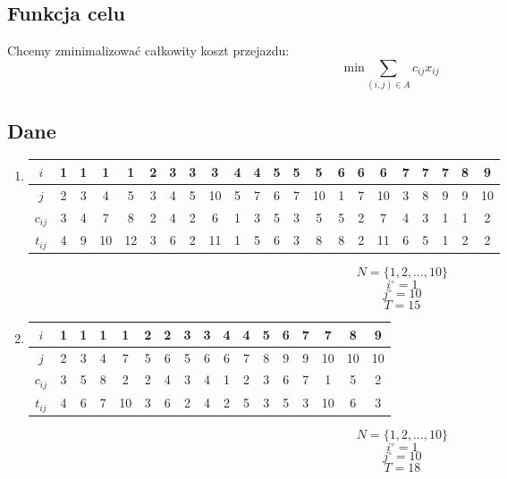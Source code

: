 \documentclass{article}
\begin{document}
\subsection{Funkcja celu}
Chcemy zminimalizować całkowity koszt przejazdu:
\[\text{min} \sum_{(i, j) \in A} c_{ij}x_{ij}\]
\subsection{Dane}
\begin{enumerate}[label=(\alph*)]
    \item 
    \begin{tabular}{|c||c|c|c|c|c|c|c|c|c|c|c|c|c|c|c|c|c|c|c|c|c|}
        \hline
         $i$ & 1 & 1 & 1 & 1 & 2 & 3 & 3 & 3 & 4 & 4 & 5 & 5 & 5 & 6 & 6 & 6 & 7 & 7 & 7 & 8 & 9 \\
        \hline
         $j$ & 2 & 3 & 4 & 5 & 3 & 4 & 5 & 10 & 5 & 7 & 6 & 7 & 10 & 1 & 7 & 10 & 3 & 8 & 9 & 9 & 10 \\
        \hline
         $c_{ij}$ & 3 & 4 & 7 & 8 & 2 & 4 & 2 & 6 & 1 & 3 & 5 & 3 & 5 & 5 & 2 & 7 & 4 & 3 & 1 & 1 & 2 \\
        \hline
         $t_{ij}$ & 4 & 9 & 10 & 12 & 3 & 6 & 2 & 11 & 1 & 5 & 6 & 3 & 8 & 8 & 2 & 11 & 6 & 5 & 1 & 2 & 2 \\
        \hline
    \end{tabular}
    \[N = \{1, 2, \dots, 10\}\]
    \[i^\circ = 1\]
    \[j^\circ = 10\]
    \[T = 15\]
    \item
    \begin{tabular}{|c||c|c|c|c|c|c|c|c|c|c|c|c|c|c|c|c|}
        \hline
         $i$ & 1 & 1 & 1 & 1 & 2 & 2 & 3 & 3 & 4 & 4 & 5 & 6 & 7 & 7 & 8 & 9 \\
        \hline
         $j$ & 2 & 3 & 4 & 7 & 5 & 6 & 5 & 6 & 6 & 7 & 8 & 9 & 9 & 10 & 10 & 10 \\
        \hline
         $c_{ij}$ & 3 & 5 & 8 & 2 & 2 & 4 & 3 & 4 & 1 & 2 & 3 & 6 & 7 & 1 & 5 & 2 \\
        \hline
         $t_{ij}$ & 4 & 6 & 7 & 10 & 3 & 6 & 2 & 4 & 2 & 5 & 3 & 5 & 3 & 10 & 6 & 3 \\
        \hline
    \end{tabular}
    \[N = \{1, 2, \dots, 10\}\]
    \[i^\circ = 1\]
    \[j^\circ = 10\]
    \[T = 18\]
\end{enumerate}
\end{document}

